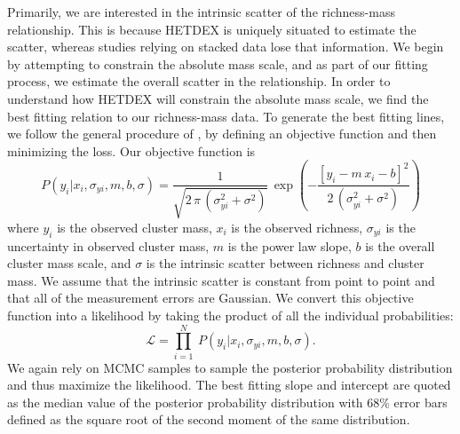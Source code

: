 \documentclass[fleqn,usenatbib]{mnras}
\begin{document}
Primarily, we are interested in the intrinsic scatter of the richness-mass relationship. This is because HETDEX is uniquely situated to estimate the scatter, whereas studies relying on stacked data  lose that information. We begin by attempting to constrain the absolute mass scale, and as part of our fitting process, we estimate the overall scatter in the relationship. In order to understand how HETDEX will constrain the absolute mass scale, we find the best fitting relation to our richness-mass data. To generate the best fitting lines, we follow the general procedure of \cite{Hogg2010}, by defining an objective function and then minimizing the loss. Our objective function is
\begin{equation}\label{eq:objectivei}
P(y_i|x_i,\sigma_{yi},m,b,\sigma) = \frac{1}{\sqrt{2\,\pi\,(\sigma_{yi}^2+\sigma^2)}}
 \,\exp\left(-\frac{[y_i - m\,x_i - b]^2}{2\,(\sigma_{yi}^2+\sigma^2)}\right)
\end{equation}
where $y_i$ is the observed cluster mass, $x_i$ is the observed richness, $\sigma_{yi}$ is the uncertainty in observed cluster mass, $m$ is the power law slope, $b$ is the overall cluster mass scale, and $\sigma$ is the intrinsic scatter between richness and cluster mass. We assume that the intrinsic scatter is constant from point to point and that all of the measurement errors are Gaussian. We convert this objective function into a likelihood by taking the product of all the individual probabilities:  
\begin{equation}\label{eq:like}
\mathscr{L} = \prod_{i=1}^N \ P(y_i|x_i,\sigma_{yi},m,b, \sigma).
\end{equation}
We again rely on MCMC samples to sample the posterior probability distribution and thus maximize the likelihood. The best fitting slope and intercept are quoted as the median value of the posterior probability distribution with 68\% error bars defined as the square root of the second moment of the same distribution.
\end{document}
